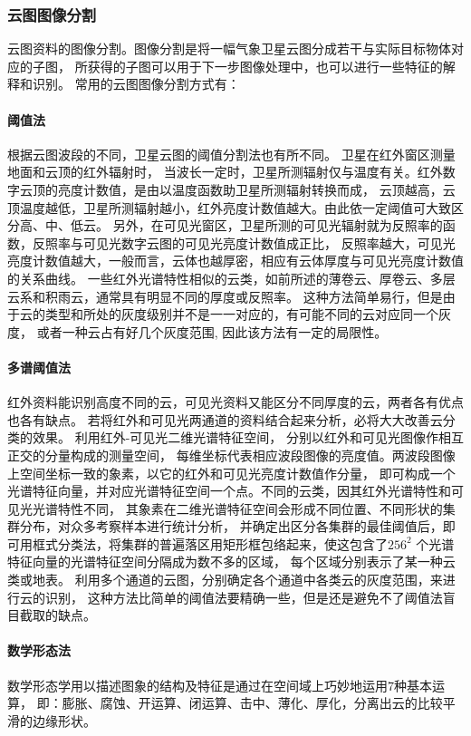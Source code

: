 \subsubsection{云图图像分割}
云图资料的图像分割。图像分割是将一幅气象卫星云图分成若干与实际目标物体对应的子图，
所获得的子图可以用于下一步图像处理中，也可以进行一些特征的解释和识别。
常用的云图图像分割方式有：

\paragraph{阈值法}
根据云图波段的不同，卫星云图的阈值分割法也有所不同。 卫星在红外窗区测量地面和云顶的红外辐射时，
当波长一定时，卫星所测辐射仅与温度有关。红外数字云顶的亮度计数值，是由以温度函数助卫星所测辐射转换而成，
云顶越高，云顶温度越低，卫星所测辐射越小，红外亮度计数值越大。由此依一定阈值可大致区分高、中、低云。
另外，在可见光窗区，卫星所测的可见光辐射就为反照率的函数，反照率与可见光数字云图的可见光亮度计数值成正比，
反照率越大，可见光亮度计数值越大，一般而言，云体也越厚密，相应有云体厚度与可见光亮度计数值的关系曲线。
一些红外光谱特性相似的云类，如前所述的薄卷云、厚卷云、多层云系和积雨云，通常具有明显不同的厚度或反照率。
这种方法简单易行，但是由于云的类型和所处的灰度级别并不是一一对应的，有可能不同的云对应同一个灰度，
或者一种云占有好几个灰度范围, 因此该方法有一定的局限性。

\paragraph{多谱阈值法}
红外资料能识别高度不同的云，可见光资料又能区分不同厚度的云，两者各有优点也各有缺点。
若将红外和可见光两通道的资料结合起来分析，必将大大改善云分类的效果。
利用红外-可见光二维光谱特征空间， 分别以红外和可见光图像作相互正交的分量构成的测量空间，
每维坐标代表相应波段图像的亮度值。两波段图像上空间坐标一致的象素，以它的红外和可见光亮度计数值作分量，
即可构成一个光谱特征向量，并对应光谱特征空间一个点。不同的云类，因其红外光谱特性和可见光光谱特性不同，
其象素在二维光谱特征空间会形成不同位置、不同形状的集群分布，对众多考察样本进行统计分析，
并确定出区分各集群的最佳阈值后，即可用框式分类法，将集群的普遍落区用矩形框包络起来，使这包含了$256^2$
个光谱特征向量的光谱特征空间分隔成为数不多的区域， 每个区域分别表示了某一种云类或地表。
利用多个通道的云图，分别确定各个通道中各类云的灰度范围，来进行云的识别，
这种方法比简单的阈值法要精确一些，但是还是避免不了阈值法盲目截取的缺点。

\paragraph{数学形态法}
数学形态学用以描述图象的结构及特征是通过在空间域上巧妙地运用7种基本运算，
即：膨胀、腐蚀、开运算、闭运算、击中、薄化、厚化，分离出云的比较平滑的边缘形状。

